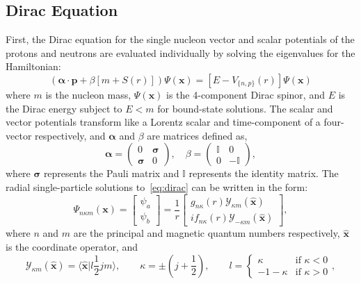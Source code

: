 \subsection{Dirac Equation}

First, the Dirac equation for the single nucleon vector and scalar potentials of the protons and neutrons are evaluated individually by solving the eigenvalues for the Hamiltonian:
\begin{equation}\label{eq:dirac}
\left( \boldsymbol{\alpha}\cdot \mathbf{p}+\beta [m+S(r)] \right) \Psi (\mathbf{x}) = \left[ E-V_{\lbrace n,p\rbrace}(r) \right] \Psi (\mathbf{x})
\end{equation}
where $m$ is the nucleon mass, $\Psi (\mathbf{x})$ is the 4-component Dirac spinor, and $E$ is the Dirac energy subject to $E<m$ for bound-state solutions. The scalar and vector potentials transform like a Lorentz scalar and time-component of a four-vector respectively, and $\boldsymbol{\alpha}$ and $\beta$ are matrices defined as,
\begin{equation}
\boldsymbol{\alpha} = 
\begin{pmatrix}
0 & \boldsymbol{\sigma} \\
\boldsymbol{\sigma} & 0
\end{pmatrix}, \quad 
\beta = 
\begin{pmatrix}
\mathbb{I} & 0 \\
0 & -\mathbb{I}
\end{pmatrix},
\end{equation}
where $\boldsymbol{\sigma}$ represents the Pauli matrix and $\mathbb{I}$ represents the identity matrix. The radial single-particle solutions to~\eqref{eq:dirac} can be written in the form:
\begin{equation}\label{eq:Psi}
\Psi_{n\kappa m}(\mathbf{x}) =
\begin{bmatrix}
\psi _a \\
\psi _b
\end{bmatrix}
= \frac{1}{r}
\begin{bmatrix}
g_{n\kappa}(r)\mathcal{Y}_{\kappa m}(\hat{\mathbf{x}}) \\
i f_{n\kappa}(r)\mathcal{Y}_{-\kappa m}(\hat{\mathbf{x}})
\end{bmatrix},
\end{equation} 
where $n$ and $m$ are the principal and magnetic quantum numbers respectively, $\hat{\mathbf{x}}$ is the coordinate operator, and
\begin{equation}\label{eq:kappa}
\mathcal{Y}_{\kappa m}(\hat{\mathbf{x}})= \bigg\langle \hat{\mathbf{x}}\bigg | l\frac{1}{2}j m \bigg\rangle, 
\qquad
\kappa = \pm \left( j+\frac{1}{2} \right),
\qquad
l = 
\begin{cases}
\kappa & \text{if } \kappa < 0 \\
-1-\kappa & \text{if } \kappa > 0 
\end{cases},
\end{equation}
